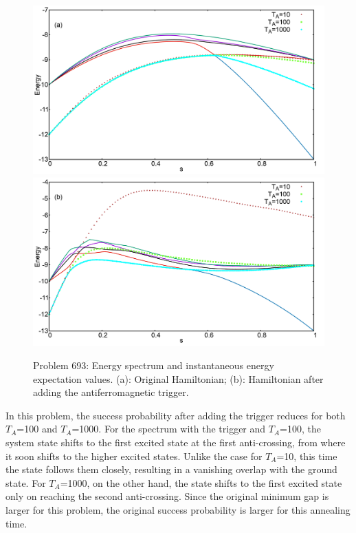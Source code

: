 \documentclass[../main.tex]{subfiles}
\begin{document}
\begin{figure}
\centering 
\includegraphics[scale=0.23]{693_O_g2.png}
\includegraphics[scale=0.23]{693_A_g2.png}
\caption{Problem 693: Energy spectrum and instantaneous energy expectation values.  (a): Original Hamiltonian; (b): Hamiltonian after adding the antiferromagnetic trigger.}
\label{fig:a42}
\end{figure}

In this problem, the success probability after adding the trigger reduces for both $T_A$=100 and $T_A$=1000. For the spectrum with the trigger and $T_A$=100, the system state shifts to the first excited state at the first anti-crossing, from where it soon shifts to the higher excited states. Unlike the case for $T_A$=10, this time the state follows them closely, resulting in a vanishing overlap with the ground state. For $T_A$=1000, on the other hand, the state shifts to the first excited state only on reaching the second anti-crossing. Since the original minimum gap is larger for this problem, the original success probability is larger for this annealing time.
\end{document}
